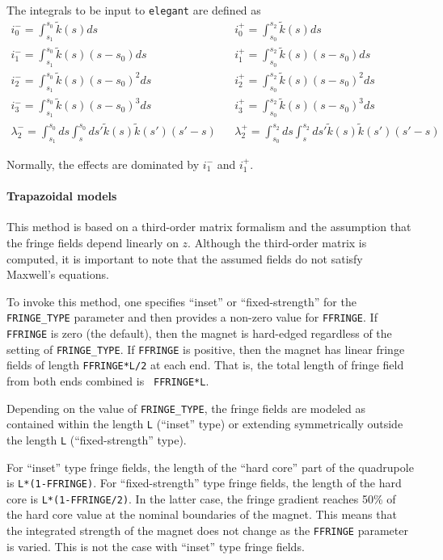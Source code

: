 The integrals to be input to {\tt elegant} are defined as 
\begin{eqnarray}
i_0^- = \int_{s_1}^{s_0} \tilde{k}(s) ds & & i_0^+ = \int_{s_0}^{s_2} \tilde{k}(s) ds \\
i_1^- = \int_{s_1}^{s_0} \tilde{k}(s) (s-s_0) ds & & i_1^+ = \int_{s_0}^{s_2} \tilde{k}(s) (s-s_0) ds \\
i_2^- = \int_{s_1}^{s_0} \tilde{k}(s) (s-s_0)^2 ds & & i_2^+ = \int_{s_0}^{s_2} \tilde{k}(s) (s-s_0)^2 ds \\
i_3^- = \int_{s_1}^{s_0} \tilde{k}(s) (s-s_0)^3 ds & & i_3^+ = \int_{s_0}^{s_2} \tilde{k}(s) (s-s_0)^3 ds \\
\lambda_2^- = \int_{s_1}^{s_0} ds \int_s^{s_0} ds\prime \tilde{k}(s) \tilde{k}(s\prime) (s\prime-s) & & 
\lambda_2^+ = \int_{s_0}^{s_2} ds \int_s^{s_2} ds\prime \tilde{k}(s) \tilde{k}(s\prime) (s\prime-s) 
\end{eqnarray}

Normally, the effects are dominated by $i_1^-$ and $i_1^+$.

\paragraph{Trapazoidal models}
This method is based on a third-order matrix formalism and the assumption that the 
fringe fields depend linearly on $z$.  Although the third-order matrix is computed, it is important
to note that the assumed fields do not satisfy Maxwell's equations.

To invoke this method, one specifies ``inset'' or
``fixed-strength'' for the \verb|FRINGE_TYPE| parameter and then provides
a non-zero value for {\tt FFRINGE}. If  {\tt FFRINGE} is zero (the default), then the magnet
is hard-edged regardless of the setting of \verb|FRINGE_TYPE|.  If {\tt FFRINGE} is positive, then the magnet has
linear fringe fields of length {\tt FFRINGE*L/2} at each end.  That
is, the total length of fringe field from both ends combined is {\tt
FFRINGE*L}.

Depending on the value of {\tt FRINGE\_TYPE}, the fringe fields are
modeled as contained within the length {\tt L} (``inset'' type) or
extending symmetrically outside the length {\tt L} (``fixed-strength''
type).

For ``inset'' type fringe fields, the length of the ``hard core'' part of
the quadrupole is {\tt L*(1-FFRINGE)}.  For ``fixed-strength'' type fringe fields,
the length of the hard core is {\tt L*(1-FFRINGE/2)}.  In the latter case,
the fringe gradient reaches 50\% of the hard core value at the nominal boundaries
of the magnet. This means that the integrated strength of the magnet does not
change as the {\tt FFRINGE} parameter is varied. This is not the case with
``inset'' type fringe fields.

